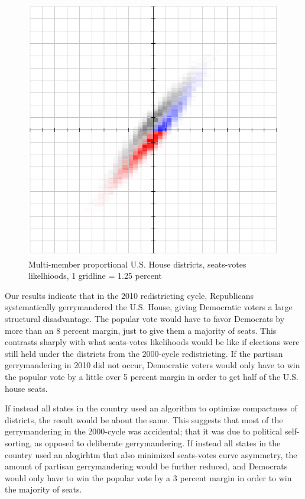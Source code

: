 \documentclass[preprint,12pt]{article}
\begin{document}
\begin{figure}[htb!]
    \begin{center}
        \includegraphics[scale=0.5]{Figures/original_method/FV_ush.png}
        \caption{Multi-member proportional U.S. House districts, seats-votes likelhioods, 1 gridline = 1.25 percent}\label{fig:FV_ush}
    \end{center}
\end{figure}

Our results indicate that in the 2010 redistricting cycle, Republicans systematically gerrymandered the U.S. House, giving Democratic voters a large structural disadvantage. The popular vote would have to favor Democrats by more than an 8 percent margin, just to give them a majority of seats.  This contrasts sharply with what seats-votes likelihoods would be like if elections were still held under the districts from the 2000-cycle redistricting.  If the partisan gerrymandering in 2010 did not occur, Democratic voters would only have to win the popular vote by a little over 5 percent margin in order to get half of the U.S. house seats.

If instead all states in the country used an algorithm to optimize compactness of districts, the result would be about the same.  This suggests that most of the gerrymandering in the 2000-cycle was accidental; that it was due to political self-sorting, as opposed to deliberate gerrymandering.  If instead all states in the country used an alogirhtm that also minimized seats-votes curve asymmetry, the amount of partisan gerrymandering would be further reduced, and Democrats would only have to win the popular vote by a 3 percent margin in order to win the majority of seats.
\end{document}
